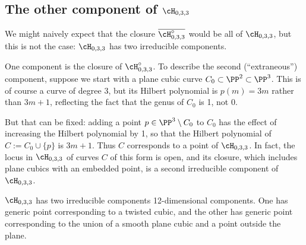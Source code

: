 \subsection{The other component of $\cH_{0,3,3}$}

We might naively expect that the closure $\overline{\cH^\circ_{0,3,3}}$ would be all of $\cH_{0,3,3}$, but this is not the case:  $\cH_{0,3,3}$ has two irreducible components. 

One component is the closure of $\cH^\circ_{0,3,3}$. To describe the second (``extraneous'') component, suppose we start with a plane cubic curve $C_0 \subset \PP^2 \subset \PP^3$. This is of course a curve of degree 3, but its Hilbert polynomial is $p(m) = 3m$ rather than $3m+1$, reflecting the fact that the genus of $C_0$ is 1, not 0.

But that can be fixed: adding a point $p \in \PP^3 \setminus C_0$ to $C_0$ has the effect of increasing the Hilbert polynomial by 1, so that the Hilbert polynomial of $C := C_0\cup \{p\}$ is $3m+1$. Thus $C$  corresponds to a point of $\cH_{0,3,3}$. In fact, the locus in $\cH_{0,3,3}$ of curves $C$ of this form is open, and its closure, which includes plane cubics with an embedded point, is a second irreducible component of $\cH_{0,3,3}$. 


\begin{theorem}
$\cH_{0,3,3}$ has two irreducible components 12-dimensional components. One has generic point corresponding to  a twisted cubic,
and the other has generic point corresponding to the union of a smooth plane cubic and a point outside the plane.
\end{theorem}


